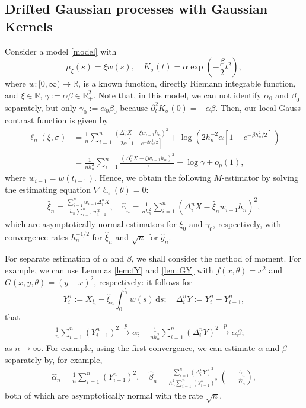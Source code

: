 \documentclass[a4paper,10pt,twoside]{article}
\numberwithin{equation}{section}
\def\R{\mathbb{R}}
\def\D{\Delta}
\def\l{\left}
\def\r{\right}
\def\a{\alpha}
\def\b{\beta}
\def\g{\gamma}
\def\th{\theta}
\def\s{\sigma}
\def\n{\nabla}
\def\p{\partial}
\def\toP{\stackrel{p}{\longrightarrow}}
\def\wh#1{\widehat{#1}}
\def\df{\mathrm{d}}
\begin{document}
\subsection{Drifted Gaussian processes with Gaussian Kernels}\label{sec:drift+gauss}
Consider a model \eqref{model} with 
\[
\mu_\xi(s) = \xi w(s),\quad K_\s(t) = \a \exp\l(-\frac{\b}{2} t^2\r),
\]
where $w:[0,\infty) \to \R$, is a known function, directly Riemann integrable function, and $\xi \in \R$, $\g:=\a\b\in \R_+^2$. 
Note that, in this model, we can not identify $\a_0$ and $\b_0$ separately, but only $\g_0 := \a_0\b_0$ because $\p^2_t K_\s(0) = - \a\b$. 
Then, our local-Gauss contrast function is given by 
\begin{align*}
\ell_n(\xi,\s) &= \frac{1}{n}\sum_{i=1}^n \frac{\l(\D_i^n X - \xi w_{i-1} h_n \r)^2}{2\a [1 - e^{-\b h_n^2/2}]} + \log \l(2 h_n^{-2}\a[1 - e^{-\b h_n^2/2}]\r) \\
&= \frac{1}{nh_n^2 }\sum_{i=1}^n \frac{\l(\D_i^n X - \xi w_{i-1} h_n \r)^2}{\g} + \log \g + o_p(1), 
\end{align*}
where $w_{i-1} = w(t_{i-1})$. 
Hence, we obtain the following $M$-estimator by solving the estimating equation  $\n \ell_n(\th) = 0$: 
\begin{align}
\wh{\xi}_n = \frac{\sum_{i=1}^n w_{i-1}\D_i^nX }{h_n \sum_{i=1}^n w_{i-1}^2},\quad \wh{\g}_n = \frac{1}{nh_n^2}\sum_{i=1}^n \l(\D_i^n X - \wh{\xi}_n w_{i-1} h_n \r)^2, \label{M-est-Gauss1}
\end{align}
which are asymptotically normal estimators for $\xi_0$ and $\g_0$, respectively, with convergence rates
$h_n^{-1/2}$ for $\widehat{\xi}_n$ and $\sqrt{n}$ for $\widehat{g}_n$.

For separate estimation of $\a$ and $\b$, we shall consider the method of moment. 
For example, we can use Lemmas \ref{lem:fY} and \ref{lem:GY} with $f(x,\th)=x^2$ and $G(x,y,\th) = (y-x)^2$, respectively: it follows for 
\[
Y_i^n := X_{t_i} -  \wh{\xi}_n\int_0^{t_i} w(s)\,\df s;\quad \D_i^n Y := Y_i^n - Y_{i-1}^n, 
\]
that 
\begin{align*}
\frac{1}{n}\sum_{i=1}^n (Y_{i-1}^n)^2 \toP \a;\quad 
\frac{1}{nh_n^2}\sum_{i=1}^n (\D_i^n Y)^2 \toP \a\b;\quad 
\end{align*}
as $n\to \infty$. For example, using the first convergence, we can estimate $\a$ and $\b$ separately by, for example, 
\begin{align}
\wh{\a}_n = \frac{1}{n}\sum_{i=1}^n (Y_{i-1}^n)^2,\quad 
\wh{\b}_n = \frac{\sum_{i=1}^n (\D_i^n Y)^2}{h_n^2\sum_{i=1}^n (Y_{i-1}^n)^2}\ \l(= \frac{\wh{\g}_n}{\wh{\a}_n}\r),  \label{M-est-Gauss2}
\end{align}
both of which are asymptotically normal with the rate $\sqrt{n}$. 
\end{document}
